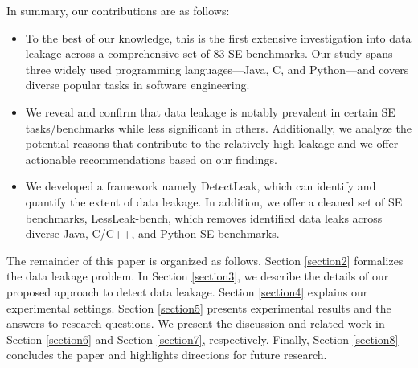 In summary, our contributions are as follows:
\begin{itemize}[leftmargin=*]
\item To the best of our knowledge, this is the first extensive investigation into data leakage across a comprehensive set of 83 SE benchmarks. Our study spans three widely used programming languages—Java, C, and Python—and covers diverse popular tasks in software engineering.
\item We reveal and confirm that data leakage is notably prevalent in certain SE tasks/benchmarks while less significant in others. Additionally, we analyze the potential reasons that contribute to the relatively high leakage and we offer actionable recommendations based on our findings.
\item We developed a framework namely DetectLeak, which can identify and quantify the extent of data leakage. In addition, we offer a cleaned set of SE benchmarks, LessLeak-bench, which removes identified data leaks across diverse Java, C/C++, and Python SE benchmarks. 
\end{itemize}

The remainder of this paper is organized as follows. Section \ref{section2} formalizes the data leakage problem. In Section \ref{section3}, we describe the details of our proposed approach to detect data leakage.
Section \ref{section4} explains our experimental settings. 
Section \ref{section5} presents experimental results and the answers to research questions. 
We present the discussion and related work in Section \ref{section6} and Section \ref{section7}, respectively. Finally, Section \ref{section8} concludes the paper and highlights directions for future research.



